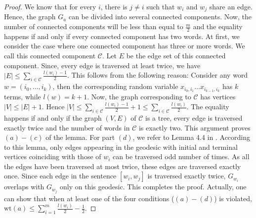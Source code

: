 \documentclass[reqno,12pt]{amsart}
\theoremstyle{plain}
\theoremstyle{definition}
\begin{document}
\begin{proof}
    We know that for every $i$, there is $j\neq i$ such that $w_{i}$ and $w_{j}$ share an edge. Hence, the graph $G_{a}$ can be divided into several connected components. Now, the number of connected components will be less than equal to $\frac{m}{2}$ and the equality happens if and only if every connected component has two words. At first, we consider the case where one connected component has three or more words. We call this connected component $\mathcal{C}$. Let $E$ be the edge set of this connected component. Since, every edge is traversed at least twice, we have $|E|\le \sum_{i \in \mathcal{C}} \frac{l(w_{i})-1}{2}$. This follows from the following reason: Consider any word $w=(i_{0},\ldots, i_{k})$, then the corresponding random variable $x_{i_{0},i_{1}}\ldots x_{i_{k-1},i_{k}}$ has $k$ terms, while $l(w)=k+1$. Now, the graph corresponding to $\mathcal{C}$ has vertices $|V|\le |E|+1$. Hence $|V|\le \sum_{i \in \mathcal{C}} \frac{l(w_{i})-1}{2} + 1 \le \sum_{i \in \mathcal{C}} \frac{l(w_{i})}{2}$. The equality happens if and only if the graph $(V,E)$ of $\mathcal{C}$ is a tree, every edge is traversed exactly twice and the number of words in $\mathcal{C}$ is exactly two. This argument proves $(a)-(c)$ of the lemma. For part $(d)$, we refer to Lemma 4.4 in \cite{AZ05}. According to this lemma, only edges appearing in the geodesic with initial and terminal vertices coinciding with those of $w_{i}$ can be traversed odd number of times. As all the edges have been traversed at most twice, these edges are traversed exactly once. Since each edge in the sentence $[w_{i},w_{j}]$ is traversed exactly twice, $G_{w_{i}}$ overlaps with $G_{w_{j}}$ only on this geodesic. This completes the proof. Actually, one can show that when at least one of the four conditions ($(a)-(d)$) is violated, $\mathrm{wt}(a)\le \sum_{i=1}^{m} \frac{l(w_{i})}{2}- \frac{1}{2}$.
\end{proof}
\end{document}

